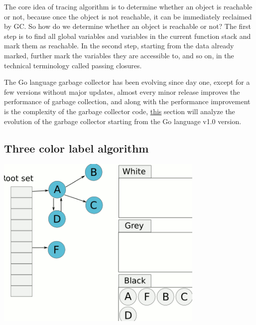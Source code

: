\documentclass[a4paper]{exam}
\theoremstyle{definition}
\begin{document}
The core idea of tracing algorithm is to determine whether an object is reachable or not, because once the object is not reachable, it can be immediately reclaimed by GC. So how do we determine whether an object is reachable or not? The first step is to find all global variables and variables in the current function stack and mark them as reachable. In the second step, starting from the data already marked, further mark the variables they are accessible to, and so on, in the technical terminology called passing closures.

The Go language garbage collector has been evolving since day one, except for a few versions without major updates, almost every minor release improves the performance of garbage collection, and along with the performance improvement is the complexity of the garbage collector code, \href{https://draveness.me/golang/docs/part3-runtime/ch07-memory/golang-garbage-collector/}{this} section will analyze the evolution of the garbage collector starting from the Go language v1.0 version.
\subsection{Three color label algorithm}
 \includegraphics[width=10cm]{img/Snipaste_2021-05-31_17-55-13.png}
\end{document}
